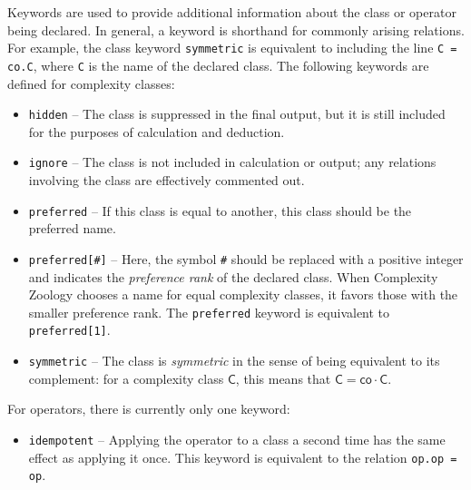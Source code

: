 \documentclass[12pt]{amsart}
\theoremstyle{definition}
\theoremstyle{remark}
\newcommand{\sC}{\mathsf{C}}
\newcommand{\co}{\mathsf{co}}
\begin{document}
Keywords are used to provide additional information about the class or
operator being declared. In general, a keyword is shorthand for commonly
arising relations. For example, the class keyword \texttt{symmetric} is
equivalent to including the line \texttt{C = co.C}, where \texttt{C} is the
name of the declared class. The following keywords are defined for complexity
classes:
\begin{itemize}
\item \texttt{hidden} -- The class is suppressed in the final output, but it is
  still included for the purposes of calculation and deduction.
\item \texttt{ignore} -- The class is not included in calculation or output;
  any relations involving the class are effectively commented out.
\item \texttt{preferred} -- If this class is equal to another, this class should
  be the preferred name.
\item \texttt{preferred[\#]} -- Here, the symbol \texttt{\#} should be replaced
  with a positive integer and indicates the \textit{preference rank} of the
  declared class. When Complexity Zoology chooses a name for equal complexity
  classes, it favors those with the smaller preference rank. The
  \texttt{preferred} keyword is equivalent to \texttt{preferred[1]}.
\item \texttt{symmetric} -- The class is \textit{symmetric} in the sense of
  being equivalent to its complement: for a complexity class $\sC$, this means
  that $\sC=\co\cdot\sC$.
\end{itemize}
For operators, there is currently only one keyword:
\begin{itemize}
\item \texttt{idempotent} -- Applying the operator to a class a second time has
  the same effect as applying it once. This keyword is equivalent to the
  relation \texttt{op.op = op}.
\end{itemize}
\end{document}
